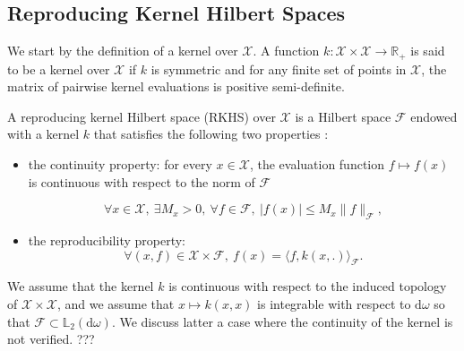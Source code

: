 \documentclass[twoside,11pt]{book}
\numberwithin{theorem}{chapter}
\numberwithin{definition}{chapter}
\numberwithin{proposition}{chapter}
\numberwithin{corollary}{chapter}
\numberwithin{example}{chapter}
\numberwithin{lemma}{chapter}
\DeclareMathOperator{\Span}{\mathrm{Span}}
\begin{document}
\subsection{Reproducing Kernel Hilbert Spaces}\label{subsec:rkhs}

We start by the definition of a kernel over $\mathcal{X}$. A function $k: \mathcal{X} \times \mathcal{X} \rightarrow \mathbb{R}_{+}$ is said to be a kernel over $\mathcal{X}$ if $k$ is symmetric and for any finite set of points in $\mathcal{X}$, the matrix of pairwise kernel evaluations is positive semi-definite.

A reproducing kernel Hilbert space (RKHS) over $\mathcal{X}$ is a Hilbert space $\mathcal{F}$ endowed with a kernel $k$ that satisfies the following two properties \cite{BeTh11}: 
\begin{itemize}
\item the continuity property: for every $x \in \mathcal{X}$, the evaluation function $f \mapsto f(x)$ is continuous with respect to the norm of $\mathcal{F}$ 

\begin{equation}
\forall x \in \mathcal{X}, \: \exists M_{x} >0 , \: \forall f \in \mathcal{F}, \: |f(x)| \leq M_{x} \|f\|_{\mathcal{F}},\nonumber
\end{equation} 
\item the reproducibility property:\begin{equation}
\forall (x,f) \in \mathcal{X}\times\mathcal{F}, \: f(x) = \langle f, k(x,.) \rangle_{\mathcal{F}}. \nonumber
\end{equation}
\end{itemize}
 
We assume that the kernel $k$ is continuous with respect to the induced topology of $\mathcal{X} \times \mathcal{X}$, and we assume that $x \mapsto k(x,x)$ is integrable with respect to $\mathrm{d}\omega$ so that $\mathcal{F} \subset \mathbb{L}_{2}(\mathrm{d}\omega)$.
We discuss latter a case where the continuity of the kernel is not verified. ???



%
 
\end{document}
